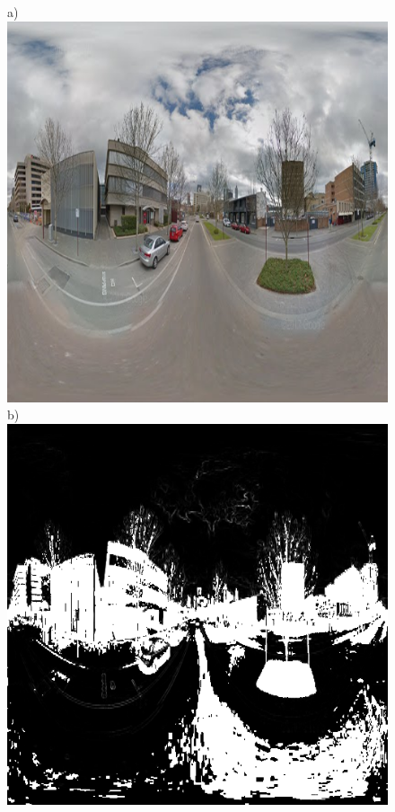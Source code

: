 \documentclass[final,3p,times,authoryear]{elsarticle}
\begin{document}
\begin{figure}
\centering    
a)\includegraphics[scale=0.20]{Images/FloodfillInput.png}
b)\includegraphics[scale=0.20]{Images/FloodfillMiddle.png}

\end{figure}
\end{document}

